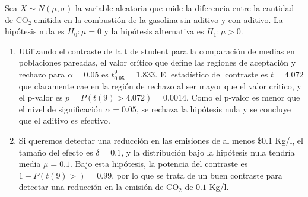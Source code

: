 \documentclass[
  a4paper,
]{scrreport}
\theoremstyle{definition}
\theoremstyle{remark}
\begin{document}
\begin{tcolorbox}[enhanced jigsaw, colframe=quarto-callout-tip-color-frame, breakable, opacityback=0, titlerule=0mm, opacitybacktitle=0.6, bottomtitle=1mm, toptitle=1mm, colback=white, leftrule=.75mm, colbacktitle=quarto-callout-tip-color!10!white, arc=.35mm, rightrule=.15mm, left=2mm, bottomrule=.15mm, toprule=.15mm, title=\textcolor{quarto-callout-tip-color}{\faLightbulb}\hspace{0.5em}{Solución}, coltitle=black]

Sea \(X\sim N(\mu,\sigma)\) la variable aleatoria que mide la diferencia
entre la cantidad de CO₂ emitida en la combustión de la gasolina sin
aditivo y con aditivo. La hipótesis nula es \(H_0: \mu = 0\) y la
hipótesis alternativa es \(H_1: \mu>0\).

\begin{enumerate}
\def\labelenumi{\alph{enumi}.}
\item
  Utilizando el contraste de la t de student para la comparación de
  medias en poblaciones pareadas, el valor crítico que define las
  regiones de aceptación y rechazo para \(\alpha=0.05\) es
  \(t^9_{0.95}=1.833\). El estadístico del contraste es \(t=4.072\) que
  claramente cae en la región de rechazo al ser mayor que el valor
  crítico, y el p-valor es \(p = P(t(9)>4.072) = 0.0014\). Como el
  p-valor es menor que el nivel de significación \(\alpha = 0.05\), se
  rechaza la hipótesis nula y se concluye que el aditivo es efectivo.
\item
  Si queremos detectar una reducción en las emisiones de al menos \$0.1
  Kg/l, el tamaño del efecto es \(\delta=0.1\), y la distribución bajo
  la hipótesis nula tendría media \(\mu=0.1\). Bajo esta hipótesis, la
  potencia del contraste es \(1-P(t(9)>) = 0.99\), por lo que se trata
  de un buen contraste para detectar una reducción en la emisión de
  CO\(_2\) de \(0.1\) Kg/l.
\end{enumerate}

\end{tcolorbox}
\end{document}
